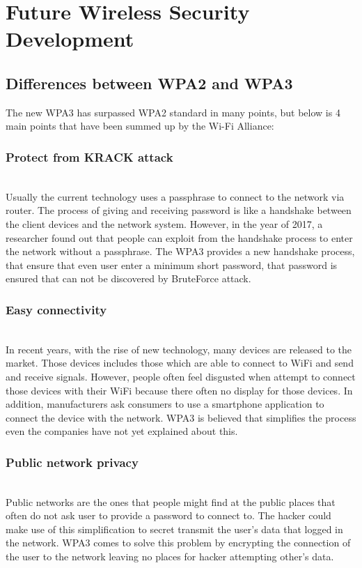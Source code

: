 \section{Future Wireless Security Development}
\subsection{Differences between WPA2 and WPA3}
The new WPA3 has surpassed WPA2 standard in many points, but below is 4 main points that have been summed up by the Wi-Fi Alliance:
\subsubsection{Protect from KRACK attack}~\\
Usually the current technology uses a passphrase to connect to the network via router. The process of giving and receiving password is like a handshake between the client devices and the network system. However, in the year of 2017, a researcher found out that people can exploit from the handshake process to enter the network without a passphrase.
The WPA3 provides a new handshake process, that ensure that even user enter a minimum short password, that password is ensured that can not be discovered by BruteForce attack.
\subsubsection{Easy connectivity}~\\
In recent years, with the rise of new technology, many devices are released to the market. Those devices includes those which are able to connect to WiFi and send and receive signals. However, people often feel disgusted when attempt to connect those devices with their WiFi because there often no display for those devices. In addition, manufacturers ask consumers to use a smartphone application to connect the device with the network.
WPA3 is believed that simplifies the process even the companies have not yet explained about this.
\subsubsection{Public network privacy}~\\
Public networks are the ones that people might find at the public places that often do not ask user to provide a password to connect to. The hacker could make use of this simplification to secret transmit the user’s data that logged in the network.
WPA3 comes to solve this problem by encrypting the connection of the user to the network leaving no places for hacker attempting other’s data.
